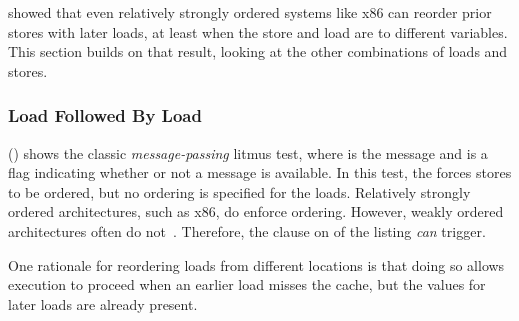 showed that even relatively strongly ordered systems like x86
can reorder prior stores with later loads, at least when the
store and load are to different variables.
This section builds on that result, looking at the other combinations of
loads and stores.

\begin{listing}[tbp]

\caption{Message-Passing Litmus Test (No Ordering)}
\label{lst:memorder:Message-Passing Litmus Test (No Ordering)}
\end{listing}

\subsubsection{Load Followed By Load}
\label{sec:memorder:Load Followed By Load}

\begin{fcvref}
()
shows the classic \emph{message-passing} litmus test, where  is
the message and  is a flag indicating whether or not a message
is available.
In this test, the  forces  stores to be ordered,
but no ordering is specified for the loads.
Relatively strongly ordered architectures, such as x86, do enforce ordering.
However, weakly ordered architectures often do
not~\cite{JadeAlglave2011ppcmem}.
Therefore, the  clause on  of the listing \emph{can}
trigger.
\end{fcvref}

One rationale for reordering loads from different locations is that doing
so allows execution to proceed when an earlier load misses the cache,
but the values for later loads are already present.

\QuickQuizEnd

